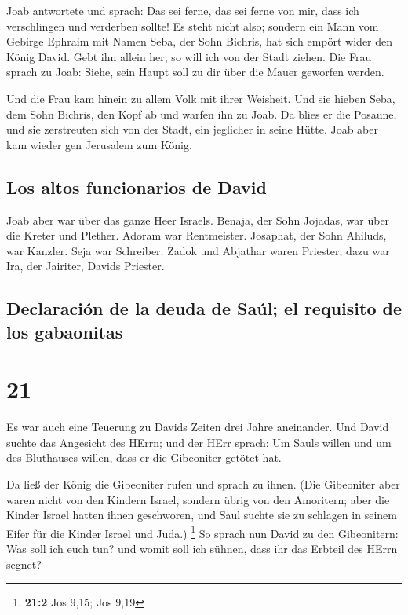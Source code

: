  Joab antwortete und sprach: Das sei ferne, das sei ferne
von mir, dass ich verschlingen und verderben sollte! Es steht nicht
also;  sondern ein Mann vom Gebirge Ephraim mit Namen
Seba, der Sohn Bichris, hat sich empört wider den König David. Gebt ihn
allein her, so will ich von der Stadt ziehen. Die Frau sprach zu Joab:
Siehe, sein Haupt soll zu dir über die Mauer geworfen werden.

 Und die Frau kam hinein zu allem Volk mit ihrer
Weisheit. Und sie hieben Seba, dem Sohn Bichris, den Kopf ab und warfen
ihn zu Joab. Da blies er die Posaune, und sie zerstreuten sich von der
Stadt, ein jeglicher in seine Hütte. Joab aber kam wieder gen Jerusalem
zum König.

\hypertarget{los-altos-funcionarios-de-david}{%
\subsection{Los altos funcionarios de
David}\label{los-altos-funcionarios-de-david}}

 Joab aber war über das ganze Heer Israels. Benaja, der
Sohn Jojadas, war über die Kreter und Plether.  Adoram
war Rentmeister. Josaphat, der Sohn Ahiluds, war Kanzler.
 Seja war Schreiber. Zadok und Abjathar waren Priester;
 dazu war Ira, der Jairiter, Davids Priester.

\hypertarget{declaraciuxf3n-de-la-deuda-de-sauxfal-el-requisito-de-los-gabaonitas}{%
\subsection{Declaración de la deuda de Saúl; el requisito de los
gabaonitas}\label{declaraciuxf3n-de-la-deuda-de-sauxfal-el-requisito-de-los-gabaonitas}}

\hypertarget{section-20}{%
\section{21}\label{section-20}}

 Es war auch eine Teuerung zu Davids Zeiten drei Jahre
aneinander. Und David suchte das Angesicht des HErrn; und der HErr
sprach: Um Sauls willen und um des Bluthauses willen, dass er die
Gibeoniter getötet hat.

 Da ließ der König die Gibeoniter rufen und sprach zu
ihnen. (Die Gibeoniter aber waren nicht von den Kindern Israel, sondern
übrig von den Amoritern; aber die Kinder Israel hatten ihnen geschworen,
und Saul suchte sie zu schlagen in seinem Eifer für die Kinder Israel
und Juda.) \footnote{\textbf{21:2} Jos 9,15; Jos 9,19}  So
sprach nun David zu den Gibeonitern: Was soll ich euch tun? und womit
soll ich sühnen, dass ihr das Erbteil des HErrn segnet?

